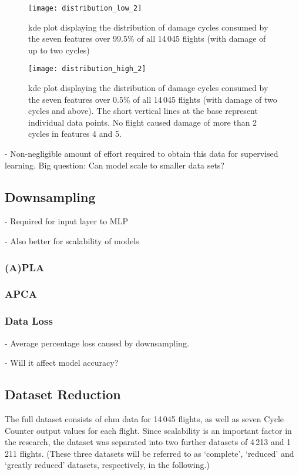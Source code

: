 \begin{figure}
    \centering
    \texttt{[image: distribution\_low\_2]}
    \caption{\label{fig:dmg_dist_low} \ac{kde} plot displaying the distribution of damage cycles consumed by the seven features over 99.5\% of all 14\,045 flights (with damage of up to two cycles)}
\end{figure}

\begin{figure}
    \centering
    \texttt{[image: distribution\_high\_2]}
    \caption{\label{fig:dmg_dist_high} \ac{kde} plot displaying the distribution of damage cycles consumed by the seven features over 0.5\% of all 14\,045 flights (with damage of two cycles and above). The short vertical lines at the base represent individual data points. No flight caused damage of more than 2 cycles in features 4 and 5.}
\end{figure}

- Non-negligible amount of effort required to obtain this data for supervised learning. Big question: Can model scale to smaller data sets?

\subsection{Downsampling}
- Required for input layer to MLP

- Also better for scalability of models

\subsubsection{(A)PLA}

\subsubsection{APCA}

\subsubsection{Data Loss}
- Average percentage loss caused by downsampling.

- Will it affect model accuracy?

\subsection{Dataset Reduction} \label{sec:data_sizes}
The full dataset consists of \ac{ehm} data for 14\,045 flights, as well as seven Cycle Counter output values for each flight. Since scalability is an important factor in the research, the dataset was separated into two further datasets of 4\,213 and 1\,211 flights. (These three datasets will be referred to as `complete', `reduced' and `greatly reduced' datasets, respectively, in the following.)

